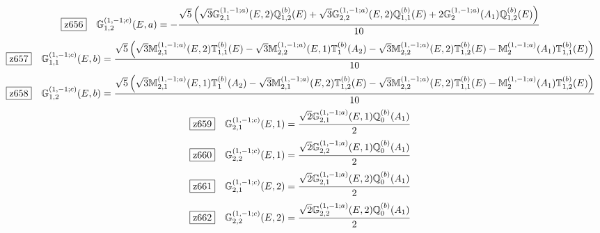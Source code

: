 \documentclass[fleqn,10pt,landscape]{jsarticle}
\begin{document}
\begin{dmath*}
\hspace*{3mm}\fbox{z656}\quad \mathbb{G}_{1,2}^{(1,-1;c)}(E,a)=- \frac{\sqrt{5} \left(\sqrt{3} \mathbb{G}_{2,1}^{(1,-1;a)}(E,2) \mathbb{Q}_{1,2}^{(b)}(E) + \sqrt{3} \mathbb{G}_{2,2}^{(1,-1;a)}(E,2) \mathbb{Q}_{1,1}^{(b)}(E) + 2 \mathbb{G}_{2}^{(1,-1;a)}(A_{1}) \mathbb{Q}_{1,2}^{(b)}(E)\right)}{10}
\end{dmath*}
\begin{dmath*}
\hspace*{3mm}\fbox{z657}\quad \mathbb{G}_{1,1}^{(1,-1;c)}(E,b)=\frac{\sqrt{5} \left(\sqrt{3} \mathbb{M}_{2,1}^{(1,-1;a)}(E,2) \mathbb{T}_{1,1}^{(b)}(E) - \sqrt{3} \mathbb{M}_{2,2}^{(1,-1;a)}(E,1) \mathbb{T}_{1}^{(b)}(A_{2}) - \sqrt{3} \mathbb{M}_{2,2}^{(1,-1;a)}(E,2) \mathbb{T}_{1,2}^{(b)}(E) - \mathbb{M}_{2}^{(1,-1;a)}(A_{1}) \mathbb{T}_{1,1}^{(b)}(E)\right)}{10}
\end{dmath*}
\begin{dmath*}
\hspace*{3mm}\fbox{z658}\quad \mathbb{G}_{1,2}^{(1,-1;c)}(E,b)=\frac{\sqrt{5} \left(\sqrt{3} \mathbb{M}_{2,1}^{(1,-1;a)}(E,1) \mathbb{T}_{1}^{(b)}(A_{2}) - \sqrt{3} \mathbb{M}_{2,1}^{(1,-1;a)}(E,2) \mathbb{T}_{1,2}^{(b)}(E) - \sqrt{3} \mathbb{M}_{2,2}^{(1,-1;a)}(E,2) \mathbb{T}_{1,1}^{(b)}(E) - \mathbb{M}_{2}^{(1,-1;a)}(A_{1}) \mathbb{T}_{1,2}^{(b)}(E)\right)}{10}
\end{dmath*}
\begin{dmath*}
\hspace*{3mm}\fbox{z659}\quad \mathbb{G}_{2,1}^{(1,-1;c)}(E,1)=\frac{\sqrt{2} \mathbb{G}_{2,1}^{(1,-1;a)}(E,1) \mathbb{Q}_{0}^{(b)}(A_{1})}{2}
\end{dmath*}
\begin{dmath*}
\hspace*{3mm}\fbox{z660}\quad \mathbb{G}_{2,2}^{(1,-1;c)}(E,1)=\frac{\sqrt{2} \mathbb{G}_{2,2}^{(1,-1;a)}(E,1) \mathbb{Q}_{0}^{(b)}(A_{1})}{2}
\end{dmath*}
\begin{dmath*}
\hspace*{3mm}\fbox{z661}\quad \mathbb{G}_{2,1}^{(1,-1;c)}(E,2)=\frac{\sqrt{2} \mathbb{G}_{2,1}^{(1,-1;a)}(E,2) \mathbb{Q}_{0}^{(b)}(A_{1})}{2}
\end{dmath*}
\begin{dmath*}
\hspace*{3mm}\fbox{z662}\quad \mathbb{G}_{2,2}^{(1,-1;c)}(E,2)=\frac{\sqrt{2} \mathbb{G}_{2,2}^{(1,-1;a)}(E,2) \mathbb{Q}_{0}^{(b)}(A_{1})}{2}
\end{dmath*}
\end{document}
